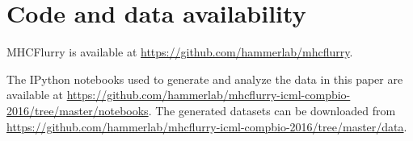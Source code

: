 \section{Code and data availability}
MHCFlurry is available at \href{https://github.com/hammerlab/mhcflurry}{https://github.com/hammerlab/mhcflurry}.

The IPython\cite{Perez_2007} notebooks used to generate and analyze the data in this paper are available at \href{https://github.com/hammerlab/mhcflurry-icml-compbio-2016/tree/master/notebooks}{https://github.com/hammerlab/mhcflurry-icml-compbio-2016/tree/master/notebooks}. The generated datasets can be downloaded from \href{https://github.com/hammerlab/mhcflurry-icml-compbio-2016/tree/master/data}{https://github.com/hammerlab/mhcflurry-icml-compbio-2016/tree/master/data}.

